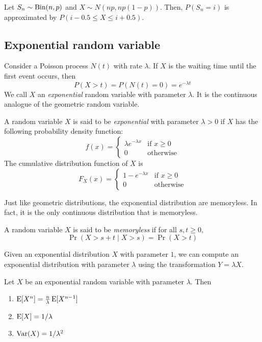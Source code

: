 \documentclass{article}
\begin{document}
\begin{remark}
  Let $S_n \sim \textnormal{Bin}(n, p)$ and $X \sim N(np, np(1 - p))$.
  Then, $P(S_n = i)$ is approximated by $P(i - 0.5 \leq X \leq i + 0.5)$.
\end{remark}

\subsection{Exponential random variable}

Consider a Poisson process $N(t)$ with rate $\lambda$.
If $X$ is the waiting time until the first event occurs, then
\[
  P(X > t) = P(N(t) = 0) = e^{-\lambda t}
\]
We call $X$ an \emph{exponential} random variable with parameter $\lambda$.
It is the continuous analogue of the geometric random variable.

\begin{definition}
  A random variable $X$ is said to be \emph{exponential} with parameter $\lambda > 0$ if $X$ has the following probability density function:
  \[
    f(x) = \begin{cases}
      \lambda e^{-\lambda x} & \text{if } x \geq 0 \\
      0                      & \text{otherwise}
    \end{cases}
  \]
  The cumulative distribution function of $X$ is
  \[
    F_X(x) = \begin{cases}
      1 - e^{-\lambda x} & \text{if } x \geq 0 \\
      0                  & \text{otherwise}
    \end{cases}
  \]
\end{definition}

Just like geometric distributions, the exponential distribution are memoryless.
In fact, it is the only continuous distribution that is memoryless.
\begin{definition}[Memorylessness]
  A random variable $X$ is said to be \emph{memoryless} if for all $s, t \geq 0$,
  \[
    \Pr(X > s + t \mid X > s) = \Pr(X > t)
  \]
\end{definition}

\begin{remark}
  Given an exponential distribution $X$ with parameter $1$, we can compute an exponential distribution with parameter $\lambda$ using the transformation $Y = \lambda X$.
\end{remark}

\begin{proposition}
  Let $X$ be an exponential random variable with parameter $\lambda$.
  Then
  \begin{enumerate}
    \item $\operatorname{E}[X^n] = \frac{n}{\lambda} \operatorname{E}[X^{n - 1}]$
    \item $\operatorname{E}[X] = 1/\lambda$
    \item $\operatorname{Var}(X) = 1/\lambda^2$
  \end{enumerate}
\end{proposition}
\end{document}
